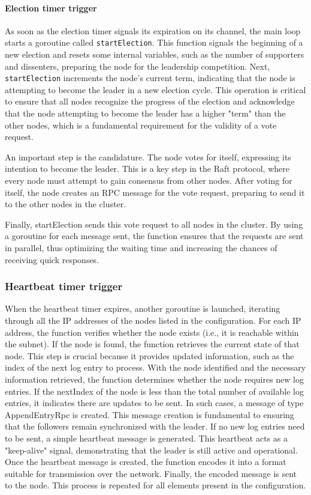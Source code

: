 \paragraph{Election timer trigger}
As soon as the election timer signals its expiration on its channel, the main loop 
starts a goroutine called \texttt{startElection}. This function signals the beginning of a 
new election and resets some internal variables, such as the number of supporters 
and dissenters, preparing the node for the leadership competition.
Next, \texttt{startElection} increments the node's current term, indicating that the node 
is attempting to become the leader in a new election cycle. This operation is critical 
to ensure that all nodes recognize the progress of the election and acknowledge that 
the node attempting to become the leader has a higher "term" than the other nodes, 
which is a fundamental requirement for the validity of a vote request.

An important step is the candidature. The node votes for itself, expressing its intention 
to become the leader. This is a key step in the Raft protocol, where every node 
must attempt to gain consensus from other nodes.
After voting for itself, the node creates an RPC message for the vote request, 
preparing to send it to the other nodes in the cluster.

Finally, startElection sends this vote request to all nodes in the cluster. By using 
a goroutine for each message sent, the function ensures that the requests are sent in 
parallel, thus optimizing the waiting time and increasing the chances of receiving quick responses.

\subsubsection{Heartbeat timer trigger}
When the heartbeat timer expires, another goroutine is launched, iterating through 
all the IP addresses of the nodes listed in the configuration. For each IP address, 
the function verifies whether the node exists (i.e., it is reachable within the 
subnet). If the node is found, the function retrieves the current state of that node.
This step is crucial because it provides updated information, such as the index of the 
next log entry to process. With the node identified and the necessary information 
retrieved, the function determines whether the node requires new log entries. If the 
nextIndex of the node is less than the total number of available log entries, it 
indicates there are updates to be sent.
In such cases, a message of type AppendEntryRpc is created. This message creation is 
fundamental to ensuring that the followers remain synchronized with the leader. If no 
new log entries need to be sent, a simple heartbeat message is generated. This 
heartbeat acts as a "keep-alive" signal, demonstrating that the leader is still active and operational.
Once the heartbeat message is created, the function encodes it into a format suitable 
for transmission over the network. Finally, the encoded message is sent to the node. 
This process is repeated for all elements present in the configuration.

